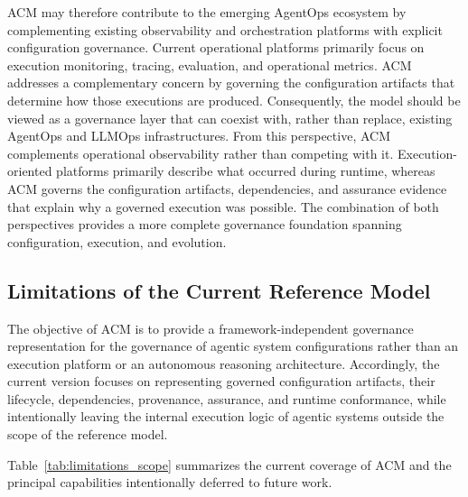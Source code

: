 \documentclass[10pt]{article}
\begin{document}
ACM may therefore contribute to the emerging AgentOps ecosystem by complementing existing observability and orchestration platforms with explicit configuration governance. Current operational platforms primarily focus on execution monitoring, tracing, evaluation, and operational metrics. ACM addresses a complementary concern by governing the configuration artifacts that determine how those executions are produced. Consequently, the model should be viewed as a governance layer that can coexist with, rather than replace, existing AgentOps and LLMOps infrastructures. 
From this perspective, ACM complements operational observability rather than competing with it. Execution-oriented platforms primarily describe what occurred during runtime, whereas ACM governs the configuration artifacts, dependencies, and assurance evidence that explain why a governed execution was possible. The combination of both perspectives provides a more complete governance foundation spanning configuration, execution, and evolution.

\subsection{Limitations of the Current Reference Model}
\label{subsec:limitations}

The objective of ACM is to provide a framework-independent governance representation for the governance of agentic system configurations rather than an execution platform or an autonomous reasoning architecture. Accordingly, the current version focuses on representing governed configuration artifacts, their lifecycle, dependencies, provenance, assurance, and runtime conformance, while intentionally leaving the internal execution logic of agentic systems outside the scope of the reference model.

Table~\ref{tab:limitations_scope} summarizes the current coverage of ACM and the principal capabilities intentionally deferred to future work.
\end{document}
